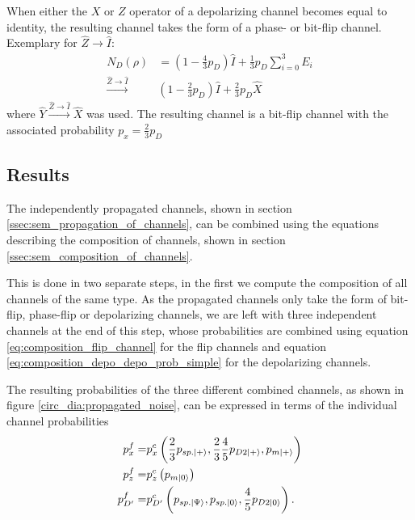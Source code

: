 When either the $X$ or $Z$ operator of a depolarizing channel becomes equal to identity, 
the resulting channel takes the form of a phase- or bit-flip channel.
Exemplary for $\hat{Z} \rightarrow \hat{I}$: 
\begin{align*}
    N_D (\rho) &= \left(1-\frac{4}{3}p_D\right) \hat{I} + \frac{1}{3} p_D \sum_{i=0}^{3} E_i \\
    \overset{\hat{Z} \rightarrow \hat{I}}{\rightarrow} & \left( 1- \frac{2}{3}p_D \right) \hat{I}+ \frac{2}{3} p_D \hat{X}
\end{align*}
where $\hat{Y} \overset{\hat{Z} \rightarrow \hat{I}}{\rightarrow}\hat{X}$ was used. 
The resulting channel is a bit-flip channel with the associated probability  $p_x = \frac{2}{3} p_D$


\subsection{Results}\label{ssec:sem_results}

The independently propagated channels, shown in section \ref{ssec:sem_propagation_of_channels}, 
can be combined using the equations describing the composition of channels, shown in section \ref{ssec:sem_composition_of_channels}.

This is done in two separate steps, in the first we compute the composition of all channels of the same type. 
As the propagated channels only take the form of bit-flip, phase-flip or depolarizing channels, we are left with three independent channels at the end of this step,
whose probabilities are combined using equation \eqref{eq:composition_flip_channel} for the flip channels and equation \eqref{eq:composition_depo_depo_prob_simple} for the depolarizing channels.

The resulting probabilities of the three different combined channels, as shown in figure \ref{circ_dia:propagated_noise}, 
can be expressed in terms of the individual channel probabilities 
\begin{align}
    p_x^f    = &p^c_x \left(\frac{2}{3}p_{sp.\ket{+}}, \frac{2}{3}\frac{4}{5}p_{D2\ket{+}}, p_{m\ket{+}} \right) \label{eq:sem_result_bit_flip_prob}\\
    p_{z}^f  = &p^c_z \left(p_{m\ket{0}} \right) \label{eq:sem_result_phase_flip_prob}\\
    p_{D'}^f = &p^c_{D'} \left(p_{sp.\ket{\Psi}},p_{sp.\ket{0}}, \frac{4}{5}p_{D2\ket{0}} \right).
    \label{eq_align:stab_depo_probability}
\end{align}

